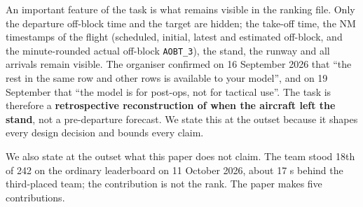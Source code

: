 \documentclass[
  manuscript=article,  %
  layout=preprint,     %
  year=2026,
  volume=4,
]{extra/joas}
\begin{document}
An important feature of the task is what remains visible in the ranking file. Only the departure off-block time and the target are hidden; the take-off time, the NM timestamps of the flight (scheduled, initial, latest and estimated off-block, and the minute-rounded actual off-block \texttt{AOBT\_\allowbreak{}3}), the stand, the runway and all arrivals remain visible. The organiser confirmed on 16 September 2026 that ``the rest in the same row and other rows is available to your model'', and on 19 September that ``the model is for post-ops, not for tactical use''. The task is therefore a \textbf{retrospective reconstruction of when the aircraft left the stand}, not a pre-departure forecast. We state this at the outset because it shapes every design decision and bounds every claim.

We also state at the outset what this paper does not claim. The team stood 18th of 242 on the ordinary leaderboard on 11 October 2026, about 17 s behind the third-placed team; the contribution is not the rank. The paper makes five contributions.
\end{document}
